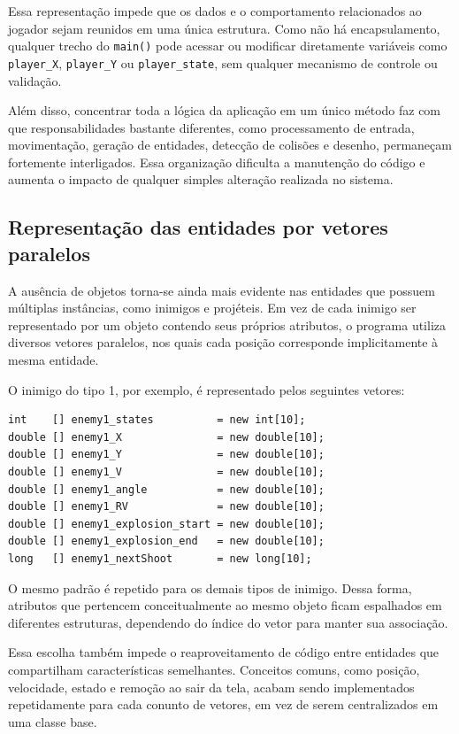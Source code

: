 Essa representação impede que os dados e o comportamento relacionados ao
jogador sejam reunidos em uma única estrutura. Como não há encapsulamento,
qualquer trecho do \texttt{main()} pode acessar ou modificar diretamente
variáveis como \texttt{player\_X}, \texttt{player\_Y} ou
\texttt{player\_state}, sem qualquer mecanismo de controle ou validação.

Além disso, concentrar toda a lógica da aplicação em um único método faz com
que responsabilidades bastante diferentes, como processamento de entrada,
movimentação, geração de entidades, detecção de colisões e desenho,
permaneçam fortemente interligados. Essa organização dificulta a manutenção do
código e aumenta o impacto de qualquer simples alteração realizada no sistema.

\subsection{Representação das entidades por vetores paralelos}

A ausência de objetos torna-se ainda mais evidente nas entidades que possuem
múltiplas instâncias, como inimigos e projéteis. Em vez de cada inimigo ser
representado por um objeto contendo seus próprios atributos, o programa utiliza
diversos vetores paralelos, nos quais cada posição corresponde implicitamente à
mesma entidade.

O inimigo do tipo 1, por exemplo, é representado pelos seguintes vetores:

\begin{lstlisting}[caption={Representação do Inimigo tipo 1 (Main.java)}]
int    [] enemy1_states          = new int[10];
double [] enemy1_X               = new double[10];
double [] enemy1_Y               = new double[10];
double [] enemy1_V               = new double[10];
double [] enemy1_angle           = new double[10];
double [] enemy1_RV              = new double[10];
double [] enemy1_explosion_start = new double[10];
double [] enemy1_explosion_end   = new double[10];
long   [] enemy1_nextShoot       = new long[10];
\end{lstlisting}

O mesmo padrão é repetido para
os demais tipos de inimigo. Dessa forma, atributos que pertencem
conceitualmente ao mesmo objeto ficam espalhados em diferentes estruturas,
dependendo do índice do vetor para manter sua associação.

Essa escolha também impede o reaproveitamento de código entre entidades que
compartilham características semelhantes. Conceitos comuns, como posição,
velocidade, estado e remoção ao sair da tela, acabam sendo implementados
repetidamente para cada conunto de vetores, em vez de serem centralizados em
uma classe base.

